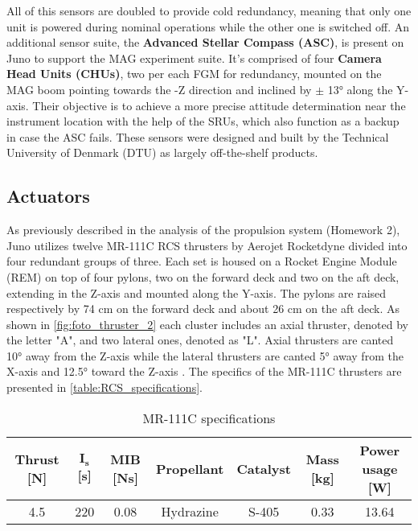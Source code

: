 All of this sensors are doubled to provide cold redundancy, meaning that only one unit is powered during nominal operations while the other one is switched off.
An additional sensor suite, the \textbf{Advanced Stellar Compass (ASC)}, is present on Juno to support the MAG experiment suite. It's comprised of four \textbf{Camera Head Units (CHUs)}, two per each FGM for redundancy, mounted on the MAG boom pointing towards the -Z direction and inclined by $\pm$ 13° along the Y-axis. Their objective is to achieve a more precise attitude determination near the instrument location with the help of the SRUs, which also function as a backup in case the ASC fails. These sensors were designed and built by the Technical University of Denmark (DTU) as largely off-the-shelf products. \cite{ASC_details}

\subsection{Actuators}
\label{subsec:Actuators}

As previously described in the analysis of the propulsion system (Homework 2), Juno utilizes twelve MR-111C RCS thrusters by Aerojet Rocketdyne \cite{RCS_info} divided into four redundant groups of three.
Each set is housed on a Rocket Engine Module (REM) on top of four pylons, two on the forward deck and two on the aft deck, extending in the Z-axis and mounted along the Y-axis.
The pylons are raised respectively by 74 cm on the forward deck and about 26 cm on the aft deck. As shown in \autoref{fig:foto_thruster_2} each cluster includes an axial thruster, denoted by the letter "A", and two lateral ones, denoted as "L".
Axial thrusters are canted 10° away from the Z-axis while the lateral thrusters are canted 5° away from the X-axis and 12.5° toward the Z-axis \cite{juno_inner}. The specifics of the MR-111C thrusters are presented in \autoref{table:RCS_specifications}. \cite{RCS_values}

\begin{table}[H]
    \renewcommand{\arraystretch}{1.3}
    \centering
    \small
    \begin{tabular}{|c|c|c|c|c|c|c|}
        \hline
        \textbf{Thrust [N]} & \textbf{$\boldsymbol{I_{s}}$ [s]} & \textbf{MIB [Ns]} & \textbf{Propellant} & \textbf{Catalyst} & \textbf{Mass [kg]} & \textbf{Power usage [W]} \\
        \hline
        \hline
        4.5 & 220 & 0.08 & Hydrazine & S-405 & 0.33 & 13.64 \\
        \hline
    \end{tabular}
    \caption{MR-111C specifications}
    \label{table:RCS_specifications}
\end{table}
\vspace*{-3mm}

